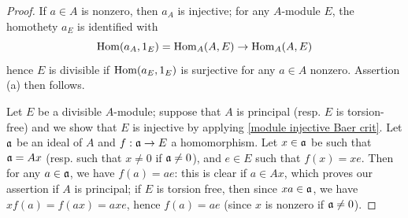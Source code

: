 \begin{proof}
If $a\in A$ is nonzero, then $a_A$ is injective; for any $A$-module $E$, the homothety $a_E$ is identified with
\[\mathrm{Hom}(a_A,1_E)=\mathrm{Hom}_A(A,E)\to\mathrm{Hom}_A(A,E)\]
hence $E$ is divisible if $\mathrm{Hom}(a_E,1_E)$ is surjective for any $a\in A$ nonzero. Assertion (a) then follows.\par
Let $E$ be a divisible $A$-module; suppose that $A$ is principal (resp. $E$ is torsion-free) and we show that $E$ is injective by applying \cref{module injective Baer crit}. Let $\mathfrak{a}$ be an ideal of $A$ and $f:\mathfrak{a}\to E$ a homomorphism. Let $x\in\mathfrak{a}$ be such that $\mathfrak{a}=Ax$ (resp. such that $x\neq 0$ if $\mathfrak{a}\neq 0$), and $e\in E$ such that $f(x)=xe$. Then for any $a\in\mathfrak{a}$, we have $f(a)=ae$: this is clear if $a\in Ax$, which proves our assertion if $A$ is principal; if $E$ is torsion free, then since $xa\in\mathfrak{a}$, we have $xf(a)=f(ax)=axe$, hence $f(a)=ae$ (since $x$ is nonzero if $\mathfrak{a}\neq 0$).  
\end{proof}
